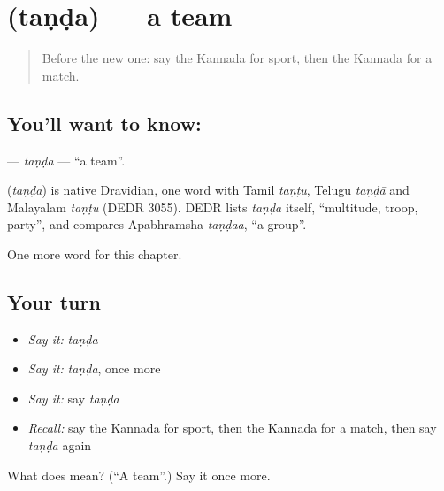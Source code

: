 \section[\texorpdfstring{\kn{ತಂಡ} (taṇḍa)}{ತಂಡ (taṇḍa)}]{ (taṇḍa) — a team}

\label{lesson:KA-C191-tanda}



\begin{quote}
Before the new one: say the Kannada for sport, then the Kannada for a match.
\end{quote}

\subsection*{You'll want to know: }
\textbf{} — \emph{taṇḍa} — \textquotedblleft{}a team\textquotedblright{}.

\begin{cousinweb}
\textbf{} (\emph{taṇḍa}) is native Dravidian, one word with Tamil \emph{taṇṭu}, Telugu \emph{taṇḍā} and Malayalam \emph{taṇṭu} (DEDR 3055). DEDR lists \emph{taṇḍa} itself, \textquotedblleft{}multitude, troop, party\textquotedblright{}, and compares Apabhramsha \emph{taṇḍaa}, \textquotedblleft{}a group\textquotedblright{}.
\end{cousinweb}

\begin{grammarlens}[title={What you've built}]
One more word for this chapter.
\end{grammarlens}

\subsection*{Your turn}
\begin{itemize}
\raggedright
  \item \emph{Say it:} \emph{taṇḍa}
  \item \emph{Say it:} \emph{taṇḍa}, once more
  \item \emph{Say it:} say \emph{taṇḍa}
  \item \emph{Recall:} say the Kannada for sport, then the Kannada for a match, then say \emph{taṇḍa} again
\end{itemize}

\begin{tcolorbox}[breakable,colback=teal!4,colframe=teal!35!black,title={Before you move on}]
What does  mean? (\textquotedblleft{}A team\textquotedblright{}.) Say it once more.
\end{tcolorbox}
